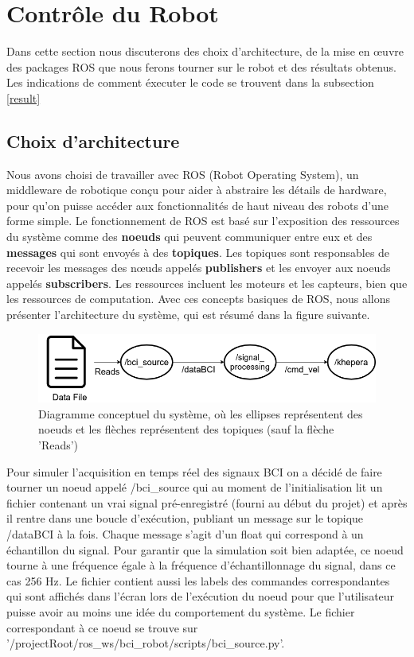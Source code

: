 
\section{Contrôle du Robot} 

Dans cette section nous discuterons des choix d'architecture, de la mise en œuvre des packages ROS que nous ferons tourner sur le robot et des résultats obtenus. Les indications de comment éxecuter le code se trouvent dans la subsection \ref{result}

\subsection{Choix d'architecture}

Nous avons choisi de travailler avec ROS (Robot Operating System), un middleware de robotique conçu pour aider à abstraire les détails de hardware, pour qu'on puisse accéder aux fonctionnalités de haut niveau des robots d'une forme simple. Le fonctionnement de ROS est basé sur l'exposition des ressources du système comme des \textbf{noeuds} qui peuvent communiquer entre eux et des \textbf{messages} qui sont envoyés à des \textbf{topiques}. Les topiques sont responsables de recevoir les messages des nœuds appelés \textbf{publishers} et les envoyer aux noeuds appelés \textbf{subscribers}. Les ressources incluent les moteurs et les capteurs, bien que les ressources de computation. Avec ces concepts basiques de ROS, nous allons présenter l'architecture du système, qui est résumé dans la figure suivante.

\begin{figure}[!h]
  \centering
	\includegraphics[scale=0.40]{images/ArchiDiagram.png}
	\caption{Diagramme conceptuel du système, où les ellipses représentent des noeuds et les flèches représentent des topiques (sauf la flèche 'Reads')}
	\label{fig:archDiag}
\end{figure}


Pour simuler l'acquisition en temps réel des signaux BCI on a décidé de faire tourner un noeud appelé /bci\_source qui au moment de l'initialisation lit un fichier contenant un vrai signal pré-enregistré (fourni au début du projet) et après il rentre dans une boucle d'exécution, publiant un message sur le topique /dataBCI à la fois. Chaque message s'agit d'un float qui correspond à un échantillon du signal. Pour garantir que la simulation soit bien adaptée, ce noeud tourne à une fréquence égale à la fréquence d'échantillonnage du signal, dans ce cas 256 Hz. Le fichier contient aussi les labels des commandes correspondantes qui sont affichés dans l'écran lors de l'exécution du noeud pour que l'utilisateur puisse avoir au moins une idée du comportement du système. Le fichier correspondant à ce noeud se trouve sur '/projectRoot/ros\_ws/bci\_robot/scripts/bci\_source.py'.

